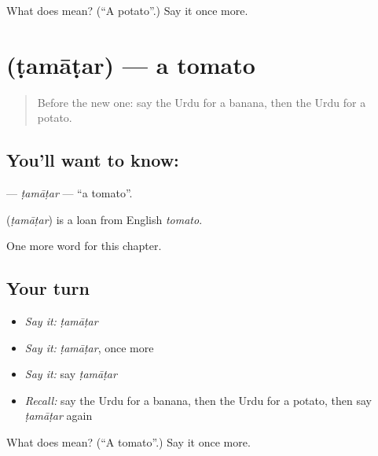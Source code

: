 \begin{tcolorbox}[breakable,colback=teal!4,colframe=teal!35!black,title={Before you move on}]
What does  mean? (\textquotedblleft{}A potato\textquotedblright{}.) Say it once more.
\end{tcolorbox}
\section[\texorpdfstring{\ur{ٹماٹر} (ṭamāṭar)}{ٹماٹر (ṭamāṭar)}]{ (ṭamāṭar) — a tomato}

\label{lesson:UR-C55-tamatar}



\begin{quote}
Before the new one: say the Urdu for a banana, then the Urdu for a potato.
\end{quote}

\subsection*{You'll want to know: }
\textbf{} — \emph{ṭamāṭar} — \textquotedblleft{}a tomato\textquotedblright{}.

\begin{cousinweb}
\textbf{} (\emph{ṭamāṭar}) is a loan from English \emph{tomato}.
\end{cousinweb}

\begin{grammarlens}[title={What you've built}]
One more word for this chapter.
\end{grammarlens}

\subsection*{Your turn}
\begin{itemize}
\raggedright
  \item \emph{Say it:} \emph{ṭamāṭar}
  \item \emph{Say it:} \emph{ṭamāṭar}, once more
  \item \emph{Say it:} say \emph{ṭamāṭar}
  \item \emph{Recall:} say the Urdu for a banana, then the Urdu for a potato, then say \emph{ṭamāṭar} again
\end{itemize}

\begin{tcolorbox}[breakable,colback=teal!4,colframe=teal!35!black,title={Before you move on}]
What does  mean? (\textquotedblleft{}A tomato\textquotedblright{}.) Say it once more.
\end{tcolorbox}
